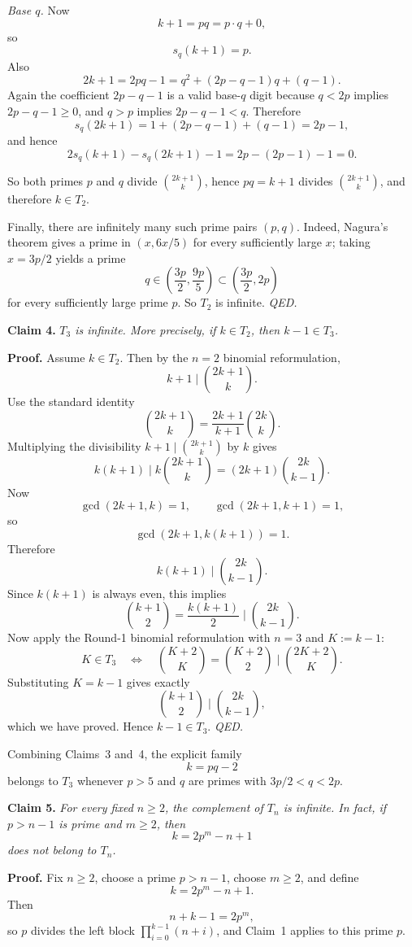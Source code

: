 \smallskip
\noindent\emph{Base $q$.}
Now
\[
k+1=pq=p\cdot q+0,
\]
so
\[
s_q(k+1)=p.
\]
Also
\[
2k+1=2pq-1=q^2+(2p-q-1)q+(q-1).
\]
Again the coefficient $2p-q-1$ is a valid base-$q$ digit because $q<2p$ implies $2p-q-1\ge 0$, and $q>p$ implies $2p-q-1<q$.
Therefore
\[
s_q(2k+1)=1+(2p-q-1)+(q-1)=2p-1,
\]
and hence
\[
2s_q(k+1)-s_q(2k+1)-1=2p-(2p-1)-1=0.
\]

So both primes $p$ and $q$ divide ${2k+1\choose k}$, hence $pq=k+1$ divides ${2k+1\choose k}$, and therefore $k\in T_2$.

Finally, there are infinitely many such prime pairs $(p,q)$.  Indeed, Nagura's theorem gives a prime in $(x,6x/5)$ for every sufficiently large $x$; taking $x=3p/2$ yields a prime
\[
q\in\left(\frac{3p}{2},\frac{9p}{5}\right)\subset\left(\frac{3p}{2},2p\right)
\]
for every sufficiently large prime $p$.
So $T_2$ is infinite.
\hfill\textit{QED.}

\medskip
\noindent\textbf{Claim 4.}
\emph{$T_3$ is infinite.  More precisely, if $k\in T_2$, then $k-1\in T_3$.}

\medskip
\noindent\textbf{Proof.}
Assume $k\in T_2$.
Then by the $n=2$ binomial reformulation,
\[
k+1\mid {2k+1\choose k}.
\]
Use the standard identity
\[
{2k+1\choose k}=\frac{2k+1}{k+1}{2k\choose k}.
\]
Multiplying the divisibility $k+1\mid {2k+1\choose k}$ by $k$ gives
\[
k(k+1)\mid k{2k+1\choose k}=(2k+1){2k\choose k-1}.
\]
Now
\[
\gcd(2k+1,k)=1,\qquad \gcd(2k+1,k+1)=1,
\]
so
\[
\gcd(2k+1,k(k+1))=1.
\]
Therefore
\[
k(k+1)\mid {2k\choose k-1}.
\]
Since $k(k+1)$ is always even, this implies
\[
{k+1\choose 2}=\frac{k(k+1)}{2}\mid {2k\choose k-1}.
\]
Now apply the Round-1 binomial reformulation with $n=3$ and $K:=k-1$:
\[
K\in T_3
\quad\Leftrightarrow\quad
{K+2\choose K}={K+2\choose 2}\mid {2K+2\choose K}.
\]
Substituting $K=k-1$ gives exactly
\[
{k+1\choose 2}\mid {2k\choose k-1},
\]
which we have proved.  Hence $k-1\in T_3$.
\hfill\textit{QED.}

Combining Claims~3 and~4, the explicit family
\[
k=pq-2
\]
belongs to $T_3$ whenever $p>5$ and $q$ are primes with $3p/2<q<2p$.

\medskip
\noindent\textbf{Claim 5.}
\emph{For every fixed $n\ge 2$, the complement of $T_n$ is infinite.  In fact, if $p>n-1$ is prime and $m\ge 2$, then}
\[
k=2p^m-n+1
\]
\emph{does not belong to $T_n$.}

\medskip
\noindent\textbf{Proof.}
Fix $n\ge 2$, choose a prime $p>n-1$, choose $m\ge 2$, and define
\[
k=2p^m-n+1.
\]
Then
\[
n+k-1=2p^m,
\]
so $p$ divides the left block $\prod_{i=0}^{k-1}(n+i)$, and Claim~1 applies to this prime $p$.

